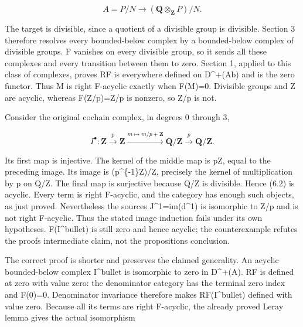 \documentclass[11pt]{article}
\begin{document}
\[
 A=P/N\longrightarrow (\mathbf Q\otimes_{\mathbf Z}P)/N.
\]

The target is divisible,\allowbreak{} since a quotient of a divisible group is divisible. Section 3 therefore resolves every bounded-below complex by a bounded-below complex of divisible groups. F vanishes on every divisible group,\allowbreak{} so it sends all these complexes and every transition between them to zero. Section 1,\allowbreak{} applied to this class of complexes,\allowbreak{} proves RF is everywhere defined on D\textasciicircum{}\allowbreak{}+(Ab)\allowbreak{} and is the zero functor. Thus M is right F-acyclic exactly when F(M)\allowbreak{}\allowbreak{}=0. Divisible groups and Z are acyclic,\allowbreak{} whereas F(Z/\allowbreak{}p)\allowbreak{}\allowbreak{}=Z/\allowbreak{}p is nonzero,\allowbreak{} so Z/\allowbreak{}p is not.

Consider the original cochain complex,\allowbreak{} in degrees 0 through 3,\allowbreak{}

\[
 I^\bullet:
 \mathbf Z\xrightarrow{\,p\,}\mathbf Z
 \xrightarrow{m\mapsto m/p+\mathbf Z}\mathbf Q/\mathbf Z
 \xrightarrow{\,p\,}\mathbf Q/\mathbf Z.                   \tag{6.2}
\]

Its first map is injective. The kernel of the middle map is pZ,\allowbreak{} equal to the preceding image. Its image is (p\textasciicircum{}\{-1\}Z)\allowbreak{}/\allowbreak{}Z,\allowbreak{} precisely the kernel of multiplication by p on Q/\allowbreak{}Z. The final map is surjective because Q/\allowbreak{}Z is divisible. Hence (6.2)\allowbreak{} is acyclic. Every term is right F-acyclic,\allowbreak{} and the category has enough such objects,\allowbreak{} as just proved. Nevertheless the source\textquotesingle s J\textasciicircum{}1\allowbreak{}=im(d\textasciicircum{}1)\allowbreak{} is isomorphic to Z/\allowbreak{}p and is not right F-acyclic. Thus the stated image induction fails under its own hypotheses. F(I\textasciicircum{}bullet)\allowbreak{} is still zero and hence acyclic; the counterexample refutes the proof\textquotesingle s intermediate claim,\allowbreak{} not the proposition\textquotesingle s conclusion.

The correct proof is shorter and preserves the claimed generality. An acyclic bounded-below complex I\^{}bullet is isomorphic to zero in D\textasciicircum{}\allowbreak{}+(A)\allowbreak{}. RF is defined at zero with value zero:\allowbreak{} the denominator category has the terminal zero index and F(0)\allowbreak{}\allowbreak{}=0. Denominator invariance therefore makes RF(I\textasciicircum{}bullet)\allowbreak{} defined with value zero. Because all its terms are right F-acyclic,\allowbreak{} the already proved Leray lemma gives the actual isomorphism
\end{document}
